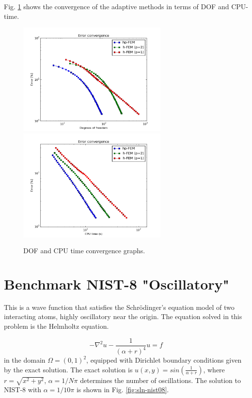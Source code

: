 \documentclass[12pt]{elsarticle}
\begin{document}
Fig. \ref{fig:nist-7-conv} shows the convergence of the adaptive methods in terms of DOF and CPU-time.

\begin{figure}[H]
\centering
\hspace{-50mm}
\includegraphics[width=7.5cm]{nist/nist-7/conv_dof_aniso.png}\ \
\hspace{-10mm}
\includegraphics[width=7.5cm]{nist/nist-7/conv_cpu_aniso.png}
\hspace{-50mm}
\caption{DOF and CPU time convergence graphs.}
\label{fig:nist-7-conv}
\vspace{-3mm}
\end{figure}


\section{Benchmark NIST-8 "Oscillatory"}
\label{sec:bench-8}

This is a wave function that satisfies the Schr\"{o}dinger's equation model of two
interacting atoms, highly oscillatory near the origin.
The equation solved in this problem is the Helmholtz equation.

\begin{equation} \label{oscillatory}
-\nabla^{2} u - \frac{1}{(\alpha + r)^{4}} u = f
\end{equation}
in the domain $\Omega = (0, 1)^2$, equipped with Dirichlet boundary conditions
given by the exact solution. The exact solution is
$u(x,y) = sin(\frac{1}{\alpha + r})$,
where $r = \sqrt{x^{2} + y^{2}}$, $\alpha = 1 / N \pi$ determines the number of oscillations.
The solution to NIST-8 with $\alpha = 1 / 10 \pi$ is shown in Fig. \ref{fig:sln-nist08}.
\end{document}
